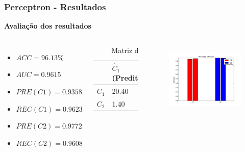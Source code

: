 \documentclass{beamer}
\begin{document}
\begin{frame}
\frametitle{Perceptron - Resultados}
\textbf{Avaliação dos resultados}
\begin{columns}[c] 
\begin{itemize}
\item $ACC = 96.13 \%$
\item $AUC = 0.9615 $
\item $PRE(C1) = 0.9358$
\item $REC(C1) = 0.9623$
\item $PRE(C2) = 0.9772$
\item $REC(C2) = 0.9608$
\end{itemize}

\begin{table}
\begin{tabular}{l l l}
\toprule
 & \textbf{$\hat{C}_1$ (Predita)} & \textbf{$\hat{C}_2$(Predita)}\\
\midrule
$C_1$ & 20.40&0.80\\ 
$C_2$ & 1.40&34.30\\ 
\bottomrule
\end{tabular}
\caption{Matriz de confusão}
\end{table}


\begin{figure}[H]
\centering
  \includegraphics[width=\linewidth]{../img/perc_rec.png}
  \label{fig:percep}
\end{figure}%

\end{columns}
\end{frame}
\end{document}
